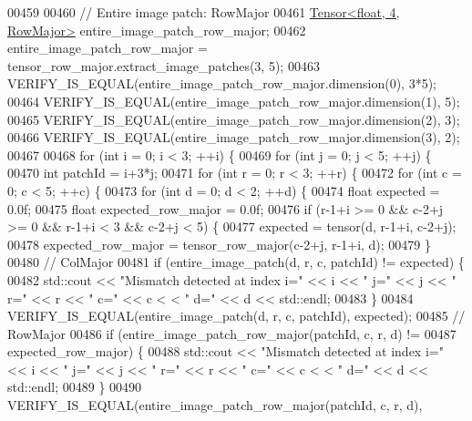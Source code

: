 \begin{DoxyCode}
00459 
00460   \textcolor{comment}{// Entire image patch: RowMajor}
00461   \hyperlink{class_eigen_1_1_tensor}{Tensor<float, 4, RowMajor>} entire\_image\_patch\_row\_major;
00462   entire\_image\_patch\_row\_major = tensor\_row\_major.extract\_image\_patches(3, 5);
00463   VERIFY\_IS\_EQUAL(entire\_image\_patch\_row\_major.dimension(0), 3*5);
00464   VERIFY\_IS\_EQUAL(entire\_image\_patch\_row\_major.dimension(1), 5);
00465   VERIFY\_IS\_EQUAL(entire\_image\_patch\_row\_major.dimension(2), 3);
00466   VERIFY\_IS\_EQUAL(entire\_image\_patch\_row\_major.dimension(3), 2);
00467 
00468   \textcolor{keywordflow}{for} (\textcolor{keywordtype}{int} i = 0; i < 3; ++i) \{
00469     \textcolor{keywordflow}{for} (\textcolor{keywordtype}{int} j = 0; j < 5; ++j) \{
00470       \textcolor{keywordtype}{int} patchId = i+3*j;
00471       \textcolor{keywordflow}{for} (\textcolor{keywordtype}{int} r = 0; r < 3; ++r) \{
00472         \textcolor{keywordflow}{for} (\textcolor{keywordtype}{int} c = 0; c < 5; ++c) \{
00473           \textcolor{keywordflow}{for} (\textcolor{keywordtype}{int} d = 0; d < 2; ++d) \{
00474             \textcolor{keywordtype}{float} expected = 0.0f;
00475             \textcolor{keywordtype}{float} expected\_row\_major = 0.0f;
00476             \textcolor{keywordflow}{if} (r-1+i >= 0 && c-2+j >= 0 && r-1+i < 3 && c-2+j < 5) \{
00477               expected = tensor(d, r-1+i, c-2+j);
00478               expected\_row\_major = tensor\_row\_major(c-2+j, r-1+i, d);
00479             \}
00480             \textcolor{comment}{// ColMajor}
00481             \textcolor{keywordflow}{if} (entire\_image\_patch(d, r, c, patchId) != expected) \{
00482               std::cout << \textcolor{stringliteral}{"Mismatch detected at index i="} << i << \textcolor{stringliteral}{" j="} << j << \textcolor{stringliteral}{" r="} << r << \textcolor{stringliteral}{" c="} << c <
      < \textcolor{stringliteral}{" d="} << d << std::endl;
00483             \}
00484             VERIFY\_IS\_EQUAL(entire\_image\_patch(d, r, c, patchId), expected);
00485             \textcolor{comment}{// RowMajor}
00486             \textcolor{keywordflow}{if} (entire\_image\_patch\_row\_major(patchId, c, r, d) !=
00487                 expected\_row\_major) \{
00488               std::cout << \textcolor{stringliteral}{"Mismatch detected at index i="} << i << \textcolor{stringliteral}{" j="} << j << \textcolor{stringliteral}{" r="} << r << \textcolor{stringliteral}{" c="} << c <
      < \textcolor{stringliteral}{" d="} << d << std::endl;
00489             \}
00490             VERIFY\_IS\_EQUAL(entire\_image\_patch\_row\_major(patchId, c, r, d),

\end{DoxyCode}

